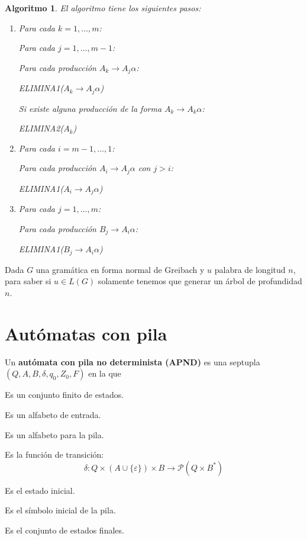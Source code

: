 \documentclass[11pt,titlepage,a4paper]{article}
\theoremstyle{ejemplo}
\theoremstyle{algoritmo}
\newtheorem*{alg}{Algoritmo} %
\begin{document}
\begin{alg}
El algoritmo tiene los siguientes pasos:
\begin{enumerate}[noitemsep]
	\item Para cada $k=1,\dots,m$:
	
	\quad\quad Para cada $j=1,\dots,m-1$:
	
	\quad\quad\quad\quad Para cada producción $A_k\to A_j\alpha$:
	
	\quad\quad\quad\quad\quad\quad ELIMINA1($A_k\to A_j\alpha$)
	
	\quad\quad Si existe alguna producción de la forma $A_k\to A_k\alpha$:
	
	\quad\quad\quad\quad ELIMINA2($A_k$)
	\item Para cada $i=m-1,\dots,1$:
	
	\quad\quad Para cada producción $A_i\to A_j\alpha$ con $j>i$:
	
	\quad\quad\quad\quad ELIMINA1($A_i\to A_j\alpha$)
	\item Para cada $j=1,\dots,m$:
	
	\quad\quad Para cada producción $B_j\to A_i\alpha$:
	
	\quad\quad\quad\quad ELIMINA1($B_j\to A_i\alpha$)
\end{enumerate}
\end{alg}

Dada $G$ una gramática en forma normal de Greibach y $u$ palabra de longitud $n$,
para saber si $u\in L(G)$ solamente tenemos que generar un árbol de profundidad 
$n$.

\newpage
\section{Autómatas con pila}

Un \textbf{autómata con pila no determinista (APND)} es una septupla $(Q,A,B,
\delta,q_0,Z_0,F)$ en la que
\begin{description}[align=right,labelwidth=1.5cm,noitemsep]
	\item [$Q$:] Es un conjunto finito de estados.
	\item [$A$:] Es un alfabeto de entrada.
	\item [$B$:] Es un alfabeto para la pila.
	\item [$\delta$:] Es la función de transición:
	$$\delta:Q\times(A\cup\{\varepsilon\})\times B\longrightarrow
	\mathcal{P}(Q\times B^*)$$
	\item [$q_0$:] Es el estado inicial.
	\item [$Z_0$:] Es el símbolo inicial de la pila.
	\item [$F$:] Es el conjunto de estados finales.
\end{description}
\end{document}
